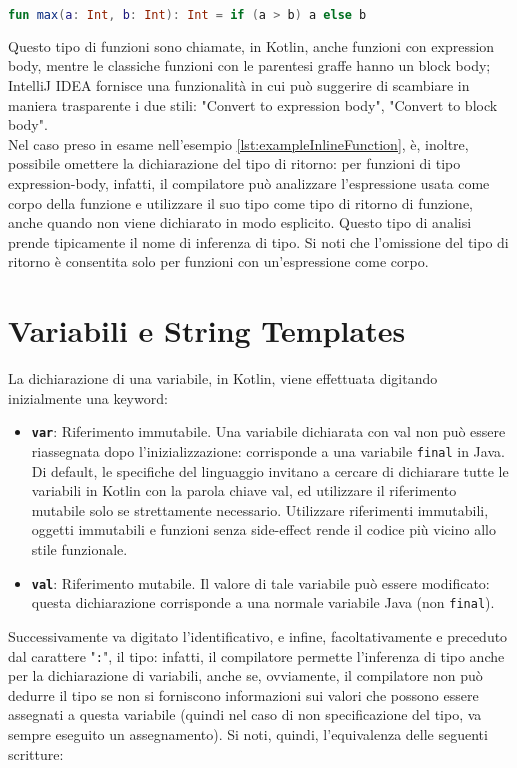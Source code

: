 \begin{lstlisting}[caption={Inline-function}, captionpos=b, label={lst:exampleInlineFunction}, language=Kotlin]
fun max(a: Int, b: Int): Int = if (a > b) a else b
\end{lstlisting}

Questo tipo di funzioni sono chiamate, in Kotlin, anche funzioni con expression body, mentre le classiche funzioni con le parentesi graffe hanno un block body; IntelliJ IDEA fornisce una funzionalità in cui può suggerire di scambiare in maniera trasparente i due stili: "Convert to expression body", "Convert to block body".\\

Nel caso preso in esame nell'esempio \ref{lst:exampleInlineFunction}, è, inoltre, possibile omettere la dichiarazione del tipo di ritorno: per funzioni di tipo expression-body, infatti, il compilatore può analizzare l'espressione usata come corpo della funzione e utilizzare il suo tipo come tipo di ritorno di funzione, anche quando non viene dichiarato in modo esplicito. Questo tipo di analisi prende tipicamente il nome di inferenza di tipo. Si noti che l'omissione del tipo di ritorno è consentita solo per funzioni con un'espressione come corpo.\\

\section{Variabili e String Templates}
La dichiarazione di una variabile, in Kotlin, viene effettuata digitando inizialmente una keyword:
\begin{itemize}
  \item {\bfseries\texttt{var}}: Riferimento immutabile. Una variabile dichiarata con val non può essere
  riassegnata dopo l'inizializzazione: corrisponde a una variabile \texttt{final} in Java. Di default, le specifiche del linguaggio invitano a cercare di dichiarare tutte le variabili in Kotlin con la parola chiave val, ed utilizzare il riferimento mutabile solo se strettamente necessario. Utilizzare riferimenti immutabili, oggetti immutabili e funzioni senza side-effect rende il codice più vicino allo stile funzionale.
  \item {\bfseries\texttt{val}}: Riferimento mutabile. Il valore di tale variabile può essere modificato: questa dichiarazione corrisponde a una normale variabile Java (non \texttt{final}).
\end{itemize}

Successivamente va digitato l'identificativo, e infine, facoltativamente e preceduto dal carattere "\texttt{:}", il tipo: infatti, il compilatore permette l'inferenza di tipo anche per la dichiarazione di variabili, anche se, ovviamente, il compilatore non può dedurre il tipo se non si forniscono informazioni sui valori che possono essere assegnati a questa variabile (quindi nel caso di non specificazione del tipo, va sempre eseguito un assegnamento). Si noti, quindi, l'equivalenza delle seguenti scritture:

